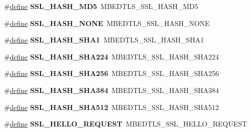 \begin{DoxyCompactItemize}
\item 
\mbox{\label{compat-1_83_8h_aea01ccea55dba8a09c2d0cdba374cd2c}} 
\#\hyperlink{structdefine}{define} {\bfseries S\+S\+L\+\_\+\+H\+A\+S\+H\+\_\+\+M\+D5}~M\+B\+E\+D\+T\+L\+S\+\_\+\+S\+S\+L\+\_\+\+H\+A\+S\+H\+\_\+\+M\+D5
\item 
\mbox{\label{compat-1_83_8h_a813754e3f260fb5cd1ab79b9e1ddcf3a}} 
\#\hyperlink{structdefine}{define} {\bfseries S\+S\+L\+\_\+\+H\+A\+S\+H\+\_\+\+N\+O\+NE}~M\+B\+E\+D\+T\+L\+S\+\_\+\+S\+S\+L\+\_\+\+H\+A\+S\+H\+\_\+\+N\+O\+NE
\item 
\mbox{\label{compat-1_83_8h_ad7eefec922748c7c1bff814c9b5f76d3}} 
\#\hyperlink{structdefine}{define} {\bfseries S\+S\+L\+\_\+\+H\+A\+S\+H\+\_\+\+S\+H\+A1}~M\+B\+E\+D\+T\+L\+S\+\_\+\+S\+S\+L\+\_\+\+H\+A\+S\+H\+\_\+\+S\+H\+A1
\item 
\mbox{\label{compat-1_83_8h_a9a08b5f7e06299cee75305b73e1a9dc5}} 
\#\hyperlink{structdefine}{define} {\bfseries S\+S\+L\+\_\+\+H\+A\+S\+H\+\_\+\+S\+H\+A224}~M\+B\+E\+D\+T\+L\+S\+\_\+\+S\+S\+L\+\_\+\+H\+A\+S\+H\+\_\+\+S\+H\+A224
\item 
\mbox{\label{compat-1_83_8h_ab51d97eb425ea28e542c0679213fe40f}} 
\#\hyperlink{structdefine}{define} {\bfseries S\+S\+L\+\_\+\+H\+A\+S\+H\+\_\+\+S\+H\+A256}~M\+B\+E\+D\+T\+L\+S\+\_\+\+S\+S\+L\+\_\+\+H\+A\+S\+H\+\_\+\+S\+H\+A256
\item 
\mbox{\label{compat-1_83_8h_a2569b6e7eaa2aec958c98f22673109e5}} 
\#\hyperlink{structdefine}{define} {\bfseries S\+S\+L\+\_\+\+H\+A\+S\+H\+\_\+\+S\+H\+A384}~M\+B\+E\+D\+T\+L\+S\+\_\+\+S\+S\+L\+\_\+\+H\+A\+S\+H\+\_\+\+S\+H\+A384
\item 
\mbox{\label{compat-1_83_8h_a5beeed84ccae1b316a473bedec444837}} 
\#\hyperlink{structdefine}{define} {\bfseries S\+S\+L\+\_\+\+H\+A\+S\+H\+\_\+\+S\+H\+A512}~M\+B\+E\+D\+T\+L\+S\+\_\+\+S\+S\+L\+\_\+\+H\+A\+S\+H\+\_\+\+S\+H\+A512
\item 
\mbox{\label{compat-1_83_8h_a52d6af739b93dcdc9a87674b2036845a}} 
\#\hyperlink{structdefine}{define} {\bfseries S\+S\+L\+\_\+\+H\+E\+L\+L\+O\+\_\+\+R\+E\+Q\+U\+E\+ST}~M\+B\+E\+D\+T\+L\+S\+\_\+\+S\+S\+L\+\_\+\+H\+E\+L\+L\+O\+\_\+\+R\+E\+Q\+U\+E\+ST

\end{DoxyCompactItemize}
